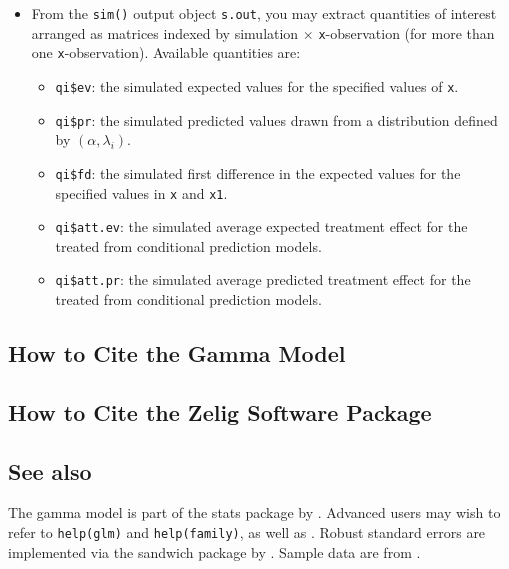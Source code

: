 \begin{itemize}
\item From the {\tt sim()} output object {\tt s.out}, you may extract
  quantities of interest arranged as matrices indexed by simulation
  $\times$ {\tt x}-observation (for more than one {\tt x}-observation).
  Available quantities are:

   \begin{itemize}
   \item {\tt qi\$ev}: the simulated expected values for the specified
     values of {\tt x}.
   \item {\tt qi\$pr}: the simulated predicted values drawn from a
     distribution defined by $(\alpha, \lambda_i)$.
   \item {\tt qi\$fd}: the simulated first difference in the expected
     values for the specified values in {\tt x} and {\tt x1}.
   \item {\tt qi\$att.ev}: the simulated average expected treatment
     effect for the treated from conditional prediction models.  
   \item {\tt qi\$att.pr}: the simulated average predicted treatment
     effect for the treated from conditional prediction models.  
   \end{itemize}

\end{itemize}


\subsection*{How to Cite the Gamma Model}

\subsection*{How to Cite the Zelig Software Package}
\CiteZelig


\subsection* {See also}
The gamma model is part of the stats package by \citet{VenRip02}.
Advanced users may wish to refer to \texttt{help(glm)} and
\texttt{help(family)}, as well as \cite{McCNel89}. Robust standard
errors are implemented via the sandwich package by \citet{Zeileis04}.
Sample data are from \cite{KinTomWit00}.





